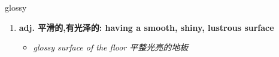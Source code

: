
\begin{frame}
{\huge glossy}
\begin{center}
\begin{enumerate}\Large
  \item \textbf{adj. 平滑的,有光泽的: having a smooth, shiny, lustrous surface}
  \begin{itemize}
    \item \em{\Large{glossy surface of the floor 平整光亮的地板}}
  \end{itemize}
\end{enumerate}
\end{center}
\end{frame}
